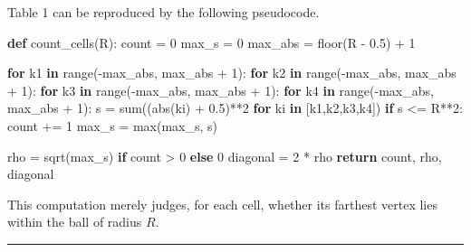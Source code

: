 \documentclass[
]{article}
\newenvironment{Shaded}{}{}
\newcommand{\BuiltInTok}[1]{\textcolor[rgb]{0.00,0.50,0.00}{#1}}
\newcommand{\ControlFlowTok}[1]{\textcolor[rgb]{0.00,0.44,0.13}{\textbf{#1}}}
\newcommand{\DecValTok}[1]{\textcolor[rgb]{0.25,0.63,0.44}{#1}}
\newcommand{\FloatTok}[1]{\textcolor[rgb]{0.25,0.63,0.44}{#1}}
\newcommand{\KeywordTok}[1]{\textcolor[rgb]{0.00,0.44,0.13}{\textbf{#1}}}
\newcommand{\NormalTok}[1]{#1}
\newcommand{\OperatorTok}[1]{\textcolor[rgb]{0.40,0.40,0.40}{#1}}
\begin{document}
Table 1 can be reproduced by the following pseudocode.

\begin{Shaded}
\begin{Highlighting}[]
\KeywordTok{def}\NormalTok{ count\_cells(R):}
\NormalTok{    count }\OperatorTok{=} \DecValTok{0}
\NormalTok{    max\_s }\OperatorTok{=} \DecValTok{0}
\NormalTok{    max\_abs }\OperatorTok{=}\NormalTok{ floor(R }\OperatorTok{{-}} \FloatTok{0.5}\NormalTok{) }\OperatorTok{+} \DecValTok{1}

    \ControlFlowTok{for}\NormalTok{ k1 }\KeywordTok{in} \BuiltInTok{range}\NormalTok{(}\OperatorTok{{-}}\NormalTok{max\_abs, max\_abs }\OperatorTok{+} \DecValTok{1}\NormalTok{):}
      \ControlFlowTok{for}\NormalTok{ k2 }\KeywordTok{in} \BuiltInTok{range}\NormalTok{(}\OperatorTok{{-}}\NormalTok{max\_abs, max\_abs }\OperatorTok{+} \DecValTok{1}\NormalTok{):}
        \ControlFlowTok{for}\NormalTok{ k3 }\KeywordTok{in} \BuiltInTok{range}\NormalTok{(}\OperatorTok{{-}}\NormalTok{max\_abs, max\_abs }\OperatorTok{+} \DecValTok{1}\NormalTok{):}
          \ControlFlowTok{for}\NormalTok{ k4 }\KeywordTok{in} \BuiltInTok{range}\NormalTok{(}\OperatorTok{{-}}\NormalTok{max\_abs, max\_abs }\OperatorTok{+} \DecValTok{1}\NormalTok{):}
\NormalTok{            s }\OperatorTok{=} \BuiltInTok{sum}\NormalTok{((}\BuiltInTok{abs}\NormalTok{(ki) }\OperatorTok{+} \FloatTok{0.5}\NormalTok{)}\OperatorTok{**}\DecValTok{2} \ControlFlowTok{for}\NormalTok{ ki }\KeywordTok{in}\NormalTok{ [k1,k2,k3,k4])}
            \ControlFlowTok{if}\NormalTok{ s }\OperatorTok{\textless{}=}\NormalTok{ R}\OperatorTok{**}\DecValTok{2}\NormalTok{:}
\NormalTok{                count }\OperatorTok{+=} \DecValTok{1}
\NormalTok{                max\_s }\OperatorTok{=} \BuiltInTok{max}\NormalTok{(max\_s, s)}

\NormalTok{    rho }\OperatorTok{=}\NormalTok{ sqrt(max\_s) }\ControlFlowTok{if}\NormalTok{ count }\OperatorTok{\textgreater{}} \DecValTok{0} \ControlFlowTok{else} \DecValTok{0}
\NormalTok{    diagonal }\OperatorTok{=} \DecValTok{2} \OperatorTok{*}\NormalTok{ rho}
    \ControlFlowTok{return}\NormalTok{ count, rho, diagonal}
\end{Highlighting}
\end{Shaded}

This computation merely judges, for each cell, whether its farthest
vertex lies within the ball of radius \(R\).

\begin{center}\rule{0.5\linewidth}{0.5pt}\end{center}
\end{document}
